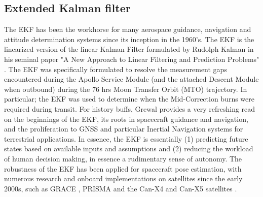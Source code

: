 


\subsection{Extended Kalman filter}\label{CHAP1_3_1}
The EKF has been the workhorse for many aerospace guidance, navigation and attitude determination systems since its inception in the 1960's. The EKF is the linearized version of the linear Kalman Filter formulated by Rudolph Kalman in his seminal paper "A New Approach to Linear Filtering and Prediction Problems" \cite{Klmn1960ANA}. The EKF was specifically formulated to resolve the measurement gaps encountered during the Apollo Service Module (and the attached Descent Module when outbound) during the 76 hrs Moon Transfer Orbit (MTO) trajectory. In particular; the EKF was used to determine when the Mid-Correction burns were required during transit. For history buffs, Grewal \cite{grewalKFHistory10} provides a very refreshing read on the beginnings of the EKF, its roots in spacecraft guidance and navigation, and the proliferation to GNSS and particular Inertial Navigation systems for terrestrial applications. In essence, the EKF is essentially (1) predicting  future states based on available inputs and assumptions \cite{hashim2021attitude} and (2) reducing the workload of human decision making, in essence a rudimentary sense of autonomy. The robustness of the EKF has been applied for spacecraft pose estimation, with numerous research and onboard implementations on satellites since the early 2000s, such as GRACE \cite{yangInterSatelliteGrace13}, PRISMA \cite{dAmicoPrisma11} and the Can-X4 and Can-X5 satellites \cite{boninCanX}.

